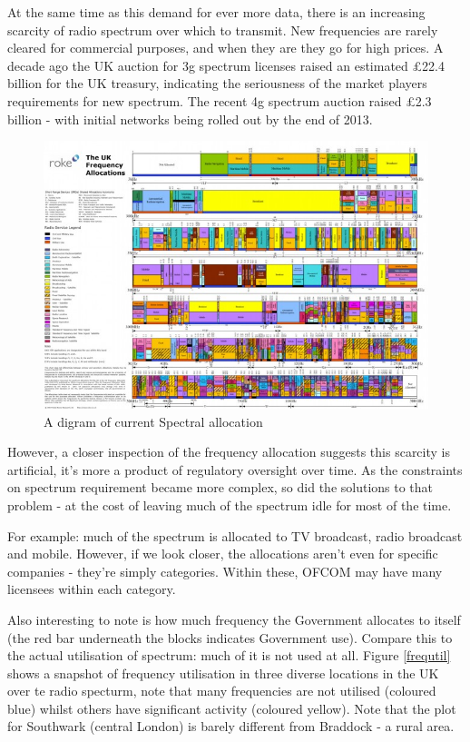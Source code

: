 \documentclass[12pt, a4paper]{article}
\begin{document}
At the same time as this demand for ever more data, there is an increasing scarcity of radio spectrum over which to transmit. New frequencies are rarely cleared for commercial purposes, and when they are they go for high prices.  A decade ago the UK auction for 3g spectrum licenses raised an estimated £22.4 billion \cite{Ukmobil} for the UK treasury, indicating the seriousness of the market players requirements for new spectrum. The recent 4g spectrum auction raised £2.3 billion \cite{BBC News}- with initial networks being rolled out by the end of 2013.

\begin{figure}[h]
\centering
\includegraphics[height = 7 cm]{uk-spectrum-allocation-chart1-640x445.jpg}
\caption{A digram of current Spectral allocation \cite{Strategy2013}}
\label{spectrumalloc}
\end{figure}

However, a closer inspection of the frequency allocation suggests this scarcity is artificial, it's more a product of regulatory oversight over time. As the constraints on spectrum requirement became more complex, so did the solutions to that problem - at the cost of leaving much of the spectrum idle for most of the time. 

For example: much of the spectrum is allocated to TV broadcast, radio broadcast and mobile. However, if we look closer, the allocations aren't even for specific companies - they're simply categories. Within these, OFCOM may have many licensees within each category.

Also interesting to note is how much frequency the Government allocates to itself (the red bar underneath the blocks indicates Government use). Compare this to the actual utilisation of spectrum: much of it is not used at all. Figure \ref{frequtil} shows a snapshot of frequency utilisation in three diverse locations in the UK over te radio specturm, note that many frequencies are not utilised (coloured blue) whilst others have significant activity (coloured yellow). Note that the plot for Southwark (central London) is barely different from Braddock - a rural area. 
\end{document}
